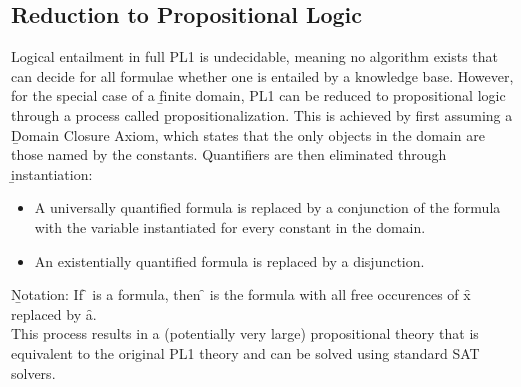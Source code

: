 \subsection{Reduction to Propositional Logic}
Logical entailment in full PL1 is undecidable, meaning no algorithm exists that can decide for all formulae whether one is entailed by a knowledge base. However, for the special case of a \b{finite domain}, PL1 can be reduced to propositional logic through a process called \b{propositionalization}. This is achieved by first assuming a \b{Domain Closure Axiom}, which states that the only objects in the domain are those named by the constants. Quantifiers are then eliminated through \b{instantiation}:
\begin{itemize}
    \item A universally quantified formula is replaced by a conjunction of the formula with the variable instantiated for every constant in the domain.
    \item An existentially quantified formula is replaced by a disjunction.
\end{itemize}
\b{Notation:} If \f{\varphi} is a formula, then \f{\varphi[x/a]} is the formula with all free occurences of \f{x} replaced by \f{a}.\\[0.5em]
This process results in a (potentially very large) propositional theory that is equivalent to the original PL1 theory and can be solved using standard SAT solvers.